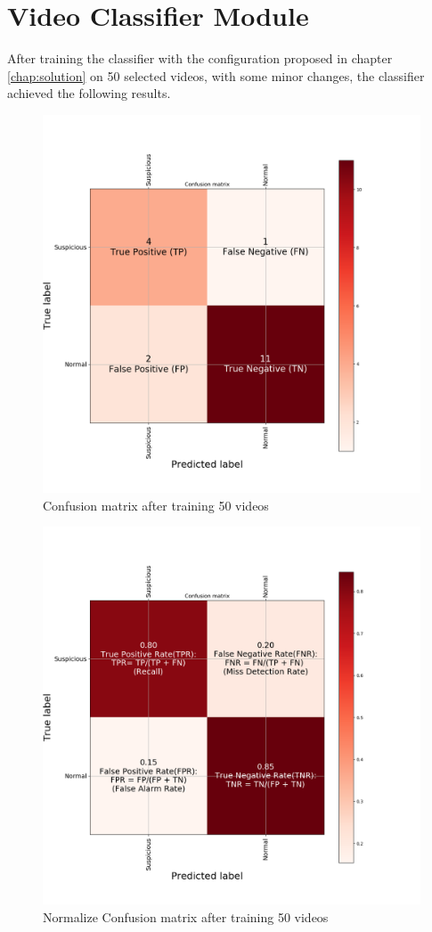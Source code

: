 \section{Video Classifier Module}
After training the classifier with the configuration proposed in chapter \ref{chap:solution} on 50 selected videos, with some minor changes, the classifier achieved the following results. 
	\begin{figure}[H]
	\centering
	\includegraphics[width=1\columnwidth]{images/chap5/confusion_matrix_detail.png}
	\caption{Confusion matrix after training 50 videos}
\end{figure}
\begin{figure}[H]
	\centering
	\includegraphics[width=1\columnwidth]{images/chap5/normalize_confusion_matrix_detail.png}
	\caption{Normalize Confusion matrix after training 50 videos}
\end{figure}
